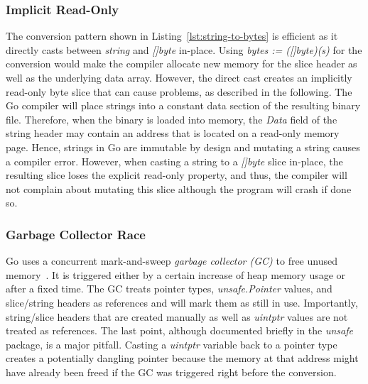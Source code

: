 \subsubsection*{Implicit Read-Only}

The conversion pattern shown in Listing~\ref{lst:string-to-bytes} is efficient as it directly casts between \textit{string} and \textit{[]byte} in-place. %
Using \textit{bytes := ([]byte)(s)} for the conversion would make the compiler allocate new memory for the slice header as well as the underlying data array.
However, the direct cast creates an implicitly read-only byte slice that can cause problems, as described in the following.
The Go compiler will place strings into a constant data section of the resulting binary file.
Therefore, when the binary is loaded into memory, the \textit{Data} field of the string header may contain an address that is located on a read-only memory page.
Hence, strings in Go are immutable by design and mutating a string causes a compiler error. %
However, when casting a string to a \textit{[]byte} slice in-place, the resulting slice loses the explicit read-only property, and thus, the compiler will not complain about mutating this slice although the program will crash if done so.


\subsubsection*{Garbage Collector Race}

Go uses a concurrent mark-and-sweep \textit{garbage collector (GC)} to free unused memory~\cite{sibiryov2017}.
It is triggered either by a certain increase of heap memory usage or after a fixed time. %
The GC treats pointer types, \textit{unsafe.Pointer} values, and slice/string headers as references and will mark them as still in use. %
Importantly, string/slice headers that are created manually as well as \textit{uintptr} values are not treated as references.
The last point, although documented briefly in the \textit{unsafe} package, is a major pitfall.
Casting a \textit{uintptr} variable back to a pointer type creates a potentially dangling pointer because the memory at that address might have already been freed if the GC was triggered right before the conversion.

